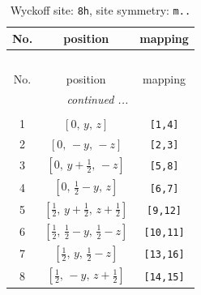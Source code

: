 \documentclass[fleqn,8pt]{jsarticle}
\begin{document}
\begin{longtable}{ccc}
\caption{Wyckoff site: {\tt 8h}, site symmetry: {\tt m..}}
 \\
 \hline \hline
No. & position & mapping \\ \hline \endfirsthead

\multicolumn{2}{l}{\tablename\ \thetable{}} \\
 \hline \hline
No. & position & mapping \\ \hline \endhead

 \hline \hline
\multicolumn{2}{r}{\footnotesize\it continued ...} \\ \endfoot

 \hline \hline
\multicolumn{2}{r}{} \\ \endlastfoot

1 & $\left[ 0,\, y,\, z \right]$ & {\tt [1,4]} \\ \hline
2 & $\left[ 0,\, - y,\, - z \right]$ & {\tt [2,3]} \\ \hline
3 & $\left[ 0,\, y + \frac{1}{2},\, - z \right]$ & {\tt [5,8]} \\ \hline
4 & $\left[ 0,\, \frac{1}{2} - y,\, z \right]$ & {\tt [6,7]} \\ \hline
5 & $\left[ \frac{1}{2},\, y + \frac{1}{2},\, z + \frac{1}{2} \right]$ & {\tt [9,12]} \\ \hline
6 & $\left[ \frac{1}{2},\, \frac{1}{2} - y,\, \frac{1}{2} - z \right]$ & {\tt [10,11]} \\ \hline
7 & $\left[ \frac{1}{2},\, y,\, \frac{1}{2} - z \right]$ & {\tt [13,16]} \\ \hline
8 & $\left[ \frac{1}{2},\, - y,\, z + \frac{1}{2} \right]$ & {\tt [14,15]} \\
\end{longtable}
\renewcommand{\arraystretch}{1.2}
\end{document}
